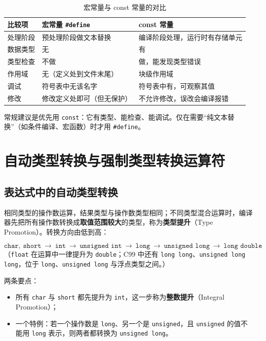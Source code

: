 \begin{table}[htbp]
\centering
\caption{宏常量与 const 常量的对比}
\small
\begin{tabularx}{\textwidth}{@{}lXX@{}}
\toprule
比较项 & 宏常量 \texttt{\#define} & const 常量 \\
\midrule
处理阶段 & 预处理阶段做文本替换 & 编译阶段处理，运行时有存储单元 \\
数据类型 & 无 & 有 \\
类型检查 & 不做 & 做，能发现类型错误 \\
作用域 & 无（定义处到文件末尾） & 块级作用域 \\
调试 & 符号表中无该名字 & 符号表中有，可观察其值 \\
修改 & 修改定义处即可（但无保护） & 不允许修改，误改会编译报错 \\
\bottomrule
\end{tabularx}
\end{table}

常规建议是优先用 \texttt{const}：它有类型、能检查、能调试。仅在需要“纯文本替换”（如条件编译、宏函数）时才用 \texttt{\#define}。

\section{自动类型转换与强制类型转换运算符}

\subsection{表达式中的自动类型转换}

相同类型的操作数运算，结果类型与操作数类型相同；不同类型混合运算时，编译器先把所有操作数转换成\textbf{取值范围较大}的类型，称为\textbf{类型提升}（Type Promotion）。转换方向由低到高：

\[
\texttt{char},\ \texttt{short}\ \to\ \texttt{int}\ \to\ \texttt{unsigned int}\ \to\ \texttt{long}\ \to\ \texttt{unsigned long}\ \to\ \texttt{long double}
\]
（\texttt{float} 在运算中一律提升为 \texttt{double}；C99 中还有 \texttt{long long}、\texttt{unsigned long long}，位于 \texttt{long}、\texttt{unsigned long} 与浮点类型之间。）

两条要点：

\begin{itemize}
  \item 所有 \texttt{char} 与 \texttt{short} 都先提升为 \texttt{int}，这一步称为\textbf{整数提升}（Integral Promotion）；
  \item 一个特例：若一个操作数是 \texttt{long}、另一个是 \texttt{unsigned}，且 \texttt{unsigned} 的值不能用 \texttt{long} 表示，则两者都转换为 \texttt{unsigned long}。
\end{itemize}

